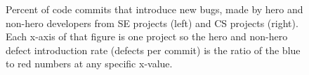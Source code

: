 \documentclass[sigconf,review,anonymous]{acmart}
\newcommand{\bi}{\begin{itemize}}
\newcommand{\ei}{\end{itemize}}
\begin{document}


\begin{figure}[!t]

\caption{Percent of code commits that introduce new bugs, made by hero and non-hero developers from  SE projects (left) and CS projects (right).
Each x-axis of that figure is one project so the hero and non-hero defect introduction rate (defects per commit) is the ratio of the blue to red numbers
at any specific x-value.
}\label{fig:heroes}
\end{figure}
\end{document}
